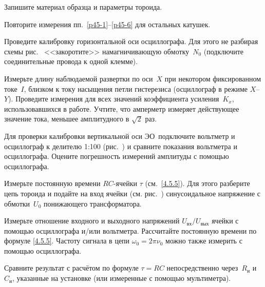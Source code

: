 \begin{lab:task}
\item \label{p45-6} Запишите материал образца и параметры тороида.

\item Повторите измерения пп.~\ref{p45-1}--\ref{p45-6} 
для остальных катушек.


\item \label{p45-8}
Проведите калибровку горизонтальной оси осциллографа. 
Для этого не разбирая схемы рис.~ 
<<закоротите>> намагничивающую обмотку~$N_0$ 
(подключите соединительные провода к одной клемме). 

Измерьте длину наблюдаемой развертки по оси~$X$ при некотором фиксированном 
токе~$I$, близком к току насыщения петли гистерезиса 
(осциллограф в режиме $X$--$Y$). 
Проведите измерения для всех значений коэффициента усиления~$K_x$, 
использовавшихся в работе. 
Учтите, что амперметр измеряет действующее значение тока, 
меньшее амплитудного в  $\sqrt{2}$ раз.

\item
Для проверки калибровки вертикальной оси ЭО~подключите вольтметр и осциллограф 
к делителю 1:100 (рис.~) и сравните показания
вольтметра и осциллографа. Оцените погрешность измерений амплитуды
с помощью осциллографа.


\item
Измерьте постоянную времени $RC$-ячейки $\tau$ (см.~\eqref{4.5.5}). 
Для этого разберите цепь тороида и подайте на вход ячейки
(см. рис.~) синусоидальное напряжение 
с обмотки~$U_0$ понижающего трансформатора.

Измерьте отношение входного и выходного напряжений 
$U_\text{вх} / U_\text{вых}$ ячейки с помощью осциллографа и/или вольтметра.
Рассчитайте постоянную времени по формуле \eqref{4.5.5}.
Частоту сигнала в цепи $\omega_0=2\pi\nu_0$ 
можно также измерить с помощью осциллографа.


\item Сравните результат с расчётом по формуле $\tau=RC$ непосредственно 
через~$R_\text{и}$ и~$C_\text{и}$, указанные на установке
(или измеренные с помощью мультиметра).





\end{lab:task}
